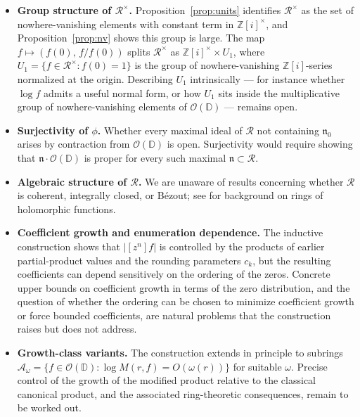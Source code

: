 \documentclass[12pt]{amsart}
\theoremstyle{definition}
\newcommand{\D}{\mathbb{D}}
\newcommand{\Zi}{\mathbb{Z}[i]}
\newcommand{\abs}[1]{\left|#1\right|}
\newcommand{\OD}{\mathcal{O}(\D)}
\newcommand{\mR}{\mathcal{R}}
\begin{document}
\begin{itemize}
\item \textbf{Group structure of $\mR^\times$.}
  Proposition~\ref{prop:units} identifies $\mR^\times$ as the set of
  nowhere-vanishing elements with constant term in $\Zi^\times$, and
  Proposition~\ref{prop:nv} shows this group is large.  The map
  $f \mapsto (f(0),\, f/f(0))$ splits $\mR^\times$ as
  $\Zi^\times \times U_1$, where $U_1 = \{f \in \mR^\times : f(0) = 1\}$
  is the group of nowhere-vanishing $\Zi$-series normalized at the
  origin.  Describing $U_1$ intrinsically — for instance whether
  $\log f$ admits a useful normal form, or how $U_1$ sits inside the
  multiplicative group of nowhere-vanishing elements of $\OD$ — remains
  open.

\item \textbf{Surjectivity of $\phi$.}  Whether every maximal ideal of
  $\mR$ not containing $\mathfrak{n}_0$ arises by contraction from
  $\OD$ is open.  Surjectivity would require showing that
  $\mathfrak{n}\cdot\OD$ is proper for every such maximal
  $\mathfrak{n} \subset \mR$.

\item \textbf{Algebraic structure of $\mR$.}  We are unaware of results
  concerning whether $\mR$ is coherent, integrally closed, or Bézout;
  see \cite{Stout} for background on rings of holomorphic functions.

\item \textbf{Coefficient growth and enumeration dependence.}
  The inductive construction shows that $\abs{[z^n]f}$ is controlled
  by the products of earlier partial-product values and the rounding
  parameters $c_k$, but the resulting coefficients can depend
  sensitively on the ordering of the zeros.  Concrete upper bounds on
  coefficient growth in terms of the zero distribution, and the
  question of whether the ordering can be chosen to minimize coefficient
  growth or force bounded coefficients, are natural problems that the
  construction raises but does not address.

\item \textbf{Growth-class variants.}  The construction extends in
  principle to subrings $\mathcal{A}_\omega = \{f \in \OD :
  \log M(r,f) = O(\omega(r))\}$ for suitable $\omega$.  Precise
  control of the growth of the modified product relative to the
  classical canonical product, and the associated ring-theoretic
  consequences, remain to be worked out.
\end{itemize}
\end{document}
